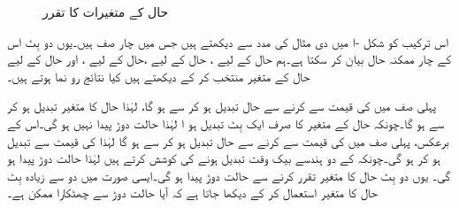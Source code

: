 \begin{figure}
\begin{subfigure}{0.45\textwidth}
\caption{}
\end{subfigure}
\caption{حال کے متغیرات کا تقرر}
\label{شکل_غیر_معاصر_حال_کے_متغیر_کا_تقرر}
\end{figure}


اس ترکیب کو شکل  -ا میں دی مثال کی مدد سے دیکھتے ہیں جس میں چار صف ہیں۔یوں دو بِٹ  اس کے چار ممکنہ حال بیان کر سکتا ہے۔ہم حال  کے لیے ، حال  کے لیے ،حال  کے لیے ، اور حال  کے لیے  حال کے متغیر منتخب کر کے دیکھتے ہیں کیا نتائج رو نما ہوتے ہیں۔

 پہلی صف میں  کی قیمت  سے  کرنے سے حال تبدیل ہو کر سے  ہو گا، لہٰذا حال کا متغیر  تبدیل ہو کر  سے  ہو گا۔چونکہ حال کے متغیر کا صرف ایک بِٹ تبدیل ہو ا لہٰذا حالت دوڑ پیدا نہیں ہو گی۔اس کے برعکس، پہلی صف میں  کی قیمت  سے  کرنے سے حال تبدیل ہو کر  سے  ہو گا لہٰذا  کی قیمت  سے تبدیل ہو کر  ہو گی۔چونکہ  کے دو ہندسے بیک وقت تبدیل ہونے کی کوشش کرتے ہیں لہٰذا حالت دوڑ پیدا ہو گی۔ یوں دو بِٹ حال کا متغیر تقرر کرنے سے حالت دوڑ پیدا ہو گی۔ایسی صورت میں دو سے زیادہ بِٹ حال کا متغیر استعمال کر کے دیکھا جاتا ہے کہ آیا حالت دوڑ سے چھٹکارا ممکن ہے۔

